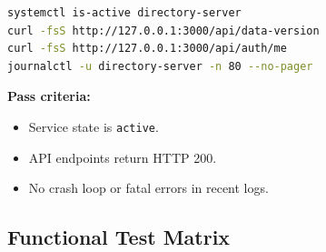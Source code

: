 \documentclass[11pt,letterpaper]{article}
\begin{document}
\begin{lstlisting}[language=bash]
systemctl is-active directory-server
curl -fsS http://127.0.0.1:3000/api/data-version
curl -fsS http://127.0.0.1:3000/api/auth/me
journalctl -u directory-server -n 80 --no-pager
\end{lstlisting}

\textbf{Pass criteria:}
\begin{itemize}
\item Service state is \texttt{active}.
\item API endpoints return HTTP 200.
\item No crash loop or fatal errors in recent logs.
\end{itemize}

\subsection{Functional Test Matrix}
\end{document}

